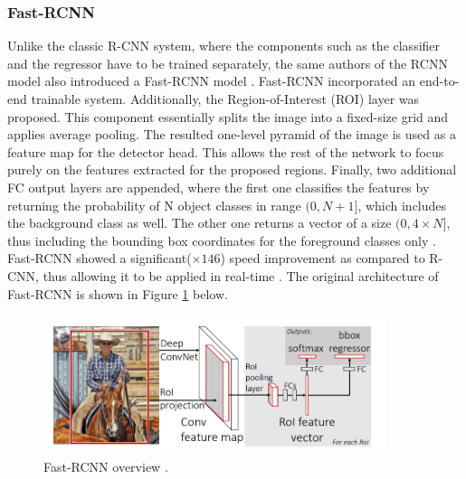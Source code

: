 \subsubsection{Fast-RCNN}
Unlike the classic R-CNN system, where the components such as the classifier and the regressor have to be trained separately, the same authors of the RCNN  model also introduced a Fast-RCNN model \cite{Girshick2015}. Fast-RCNN incorporated an end-to-end trainable system. Additionally, the Region-of-Interest (ROI) layer was proposed. This component essentially splits the image into a fixed-size grid and applies  average pooling. The resulted one-level pyramid of the image is used as a feature map for the detector head. This allows the rest of the network to focus purely on the features extracted for the proposed regions. Finally, two additional FC output layers are appended, where the first one classifies the features by returning the probability of N object classes in range $(0, N+1]$, which includes the background class as well. The other one returns a vector of a size $(0, 4\times N]$, thus including the bounding box coordinates for the foreground classes only \cite{Girshick2015}. Fast-RCNN showed a significant($\times 146$) speed improvement as compared to R-CNN, thus allowing it to be applied in real-time \cite{Girshick2013}. The original architecture of Fast-RCNN is shown in Figure \ref{fast_rcnn} below. 

\begin{figure}[htb]
	\begin{center}
		\includegraphics[width=10cm]{./fast_rcnn.png}
	\end{center}
	\caption{Fast-RCNN overview \cite{Girshick2015}.}\label{fast_rcnn}
	\begin{center}
	\end{center}
\end{figure}
\FloatBarrier

